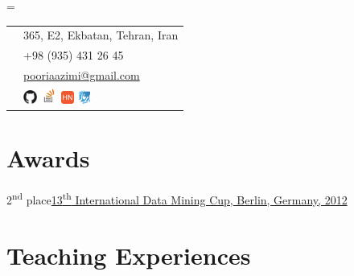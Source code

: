 \documentclass{tccv}
\begin{document}
{{\needspace{0.5\textheight}%
    \newdimen\boxwidth%
    \boxwidth=\dimexpr{}\fboxsep\relax%
    \colorbox[HTML]{BEDBE3}{%
    \begin{tabularx}{\boxwidth}{c|X}
	    \Writinghand & 
	    {365, E2, Ekbatan, Tehran, Iran}\smallskip\\
	    \Telefon     & 
	    {+98 (935) 431 26 45}\smallskip\\
	    \Letter      & 
	    \href{mailto:pooriaazimi@gmail.com}{pooriaazimi@gmail.com}
	    \\[3pt]
	     & 
		\href{https://github.com/pooriaazimi/}{\includegraphics[width=13pt]{Logos/Github.pdf}}
		\href{http://stackoverflow.com/users/347353/pooria-azimi}{\includegraphics[width=15pt]{Logos/StackOverflow.pdf}}
		\href{https://news.ycombinator.com/user?id=pooriaazimi}{\includegraphics[width=12pt]{Logos/HN.pdf}}
		\href{http://forum.irmug.com}{\includegraphics[width=13pt]{Logos/IRMUG.pdf}}
	\end{tabularx}}
	





\vspace{8pt}





\section{Awards}

\begin{factlist}
	
	\item{\small 2\textsuperscript{nd} place}{\href{http://www.data-mining-cup.de/en/review/dmc-2012/}{13\textsuperscript{th} International Data Mining Cup, Berlin, Germany, 2012}}

\end{factlist}






\section{Teaching Experiences}

}}
\end{document}
